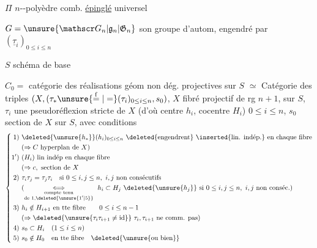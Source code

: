 $\Pi$ $n$--polyèdre comb. \uline{épinglé} universel

$G=\unsure{\mathscr G_n|\mathfrak g_n|\mathfrak G_n}$ son groupe d'autom, engendré par $(\underline\tau_i)_{0\leq i\leq n}$

$S$ schéma de base

$\boxed{C_0}={}$ catégorie  des réalisations géom non dég. projectives sur $S$
$\simeq{}$ Catégorie des triples $(X,(\tau_*\unsure{\overset{\mathrm f}{=}|=}(\tau_i)_{0\leq i\leq n},s_0)$, $X$ fibré projectif de rg $n+1$, sur $S$, $\tau_i$ une pseudoréflexion stricte de $X$ (d'où centre $h_i$, cocentre $H_i$) $0\leq i\leq n$, $s_0$ section de $X$ sur $S$, avec conditions
\[
\left\{\begin{aligned}
1)\ &\deleted{\unsure{h_*}}(h_i)_{0\leq i\leq n}\ \deleted{\text{engendrent}}\ \inserted{\text{lin. indép.}}\ \text{en chaque fibre}\\
&(\Rightarrow C\text{ hyperplan de }X)\\
1')\ &(H_i)\ \text{lin indép en chaque fibre}\\
&(\Rightarrow c,\text{ section de }X\\
2)\ &\tau_i\tau_j=\tau_j\tau_i\quad\text{si }0\leq i,j\leq n,\ i,j\text{ non consécutifs}\\
&(\underset{\substack{\text{compte tenu}\\\text{de }1,\deleted{\unsure{1'|5}}}}{\Longleftrightarrow}\ h_i\subset H_j\ \deleted{\unsure{h_j}}\text{ si }0\leq i,j\leq n,\ i,j\text{ non conséc.})\\
3)\ &h_i\notin H_{i+1}\ \text{en tte fibre}\qquad 0\leq i\leq n-1\\
&(\Rightarrow\deleted{\unsure{\tau_i\tau_{i+1}\ne\mathrm{id}}}\ \tau_i,\tau_{i+1}\text{ ne comm. pas})\\
4)\ &s_0\subset H_i\quad(1\leq i\leq n)\\
5)\ &s_0\notin H_0\quad\text{en tte fibre}\quad\deleted{\unsure{\text{ou bien}}}
\end{aligned}\right.
\]


